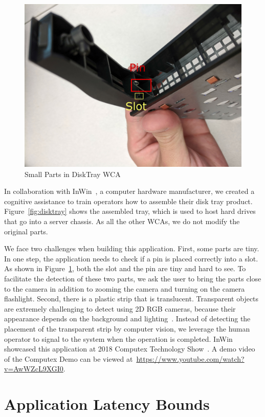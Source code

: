 \begin{figure}
\centering
\includegraphics[width=0.5\linewidth]{FIGS/disktray-challenge.jpg}
\caption{\small Small Parts in DiskTray WCA}
\label{fig:disktray-challenge}
\end{figure}

In collaboration with InWin~\cite{inwin}, a computer hardware manufacturer, we
created a cognitive assistance to train operators how to assemble their disk
tray product. Figure~\ref{fig:disktray} shows the assembled tray, which is used
to host hard drives that go into a server chassis. As all the other WCAs, we do
not modify the original parts. 

We face two challenges when building this application. First, some parts are
tiny. In one step, the application needs to check if a pin is placed correctly
into a slot. As shown in Figure~\ref{fig:disktray-challenge}, both the slot and
the pin are tiny and hard to see. To facilitate the detection of these two
parts, we ask the user to bring the parts close to the camera in addition to
zooming the camera and turning on the camera flashlight. Second, there is a
plastic strip that is translucent. Transparent objects are extremely challenging
to detect using 2D RGB cameras, because their appearance depends on the
background and lighting~\cite{lysenkov2013recognition}. Instead of detecting the
placement of the transparent strip by computer vision, we leverage the human
operator to signal to the system when the operation is completed. InWin
showcased this application at 2018 Computex Technology Show~\cite{computex}. A
demo video of the Computex Demo can be viewed
at~\url{https://www.youtube.com/watch?v=AwWZcL9XGI0}.


\section{Application Latency Bounds}

